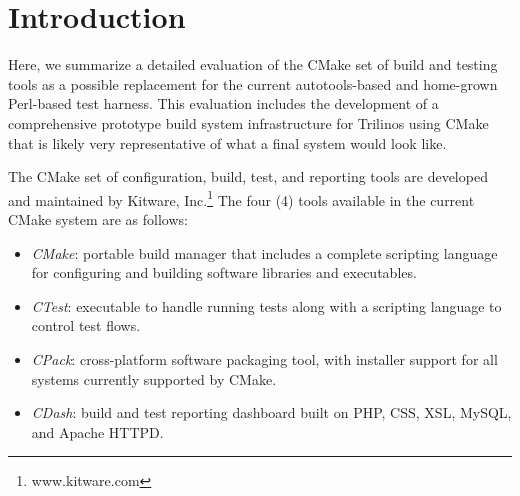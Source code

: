 \documentclass[pdf,ps2pdf,11pt]{SANDreport}
\begin{document}

%
\setcounter{secnumdepth}{3}
\SANDmain %


%
\section{Introduction}
%

Here, we summarize a detailed evaluation of the CMake set of build and
testing tools as a possible replacement for the current
autotools-based and home-grown Perl-based test harness.  This
evaluation includes the development of a comprehensive prototype build
system infrastructure for Trilinos using CMake that is likely very
representative of what a final system would look like.

The CMake set of configuration, build, test, and reporting tools are
developed and maintained by Kitware,
Inc.\footnote{www.kitware.com} The four (4) tools available in the
current CMake system are as follows:

\begin{itemize}
 {}\item {\em CMake}: portable build manager that includes a complete
 scripting language for configuring and building software libraries and
 executables.

 {}\item {\em CTest}: executable to handle running tests along with a
 scripting language to control test flows.

 {}\item {\em CPack}: cross-platform software packaging tool, with
 installer support for all systems currently supported by CMake.

 {}\item {\em CDash}: build and test reporting dashboard built on PHP,
 CSS, XSL, MySQL, and Apache HTTPD.

\end{itemize} 
\end{document}

